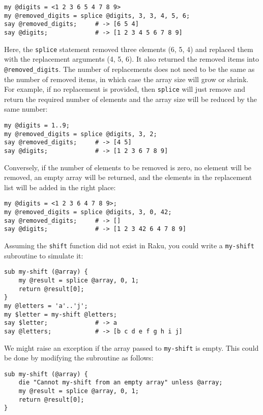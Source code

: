\begin{verbatim}
my @digits = <1 2 3 6 5 4 7 8 9>
my @removed_digits = splice @digits, 3, 3, 4, 5, 6;
say @removed_digits;     # -> [6 5 4]
say @digits;             # -> [1 2 3 4 5 6 7 8 9]
\end{verbatim}
%
Here, the {\tt splice} statement removed three elements (6, 5, 4) 
and replaced them with the replacement arguments (4, 5, 6). 
It also returned the removed items into \verb'@removed_digits'. 
The number of replacements does not need to be the same as the number 
of removed items, in which case the array size will grow or 
shrink. For example, if no replacement is provided, then 
{\tt splice} will just remove and return the required number 
of elements and the array size will be reduced by the same number:

\begin{verbatim}
my @digits = 1..9;
my @removed_digits = splice @digits, 3, 2;
say @removed_digits;     # -> [4 5]
say @digits;             # -> [1 2 3 6 7 8 9]
\end{verbatim}
%

Conversely, if the number of elements to be removed is zero, 
no element will be removed, an empty array will be returned, 
and the elements in the replacement list will be added in 
the right place:

\begin{verbatim}
my @digits = <1 2 3 6 4 7 8 9>;
my @removed_digits = splice @digits, 3, 0, 42;
say @removed_digits;     # -> []
say @digits;             # -> [1 2 3 42 6 4 7 8 9]
\end{verbatim}
%

Assuming the {\tt shift} function did not exist in Raku, 
you could write a {\tt my-shift} subroutine to simulate it:

\begin{verbatim}
sub my-shift (@array) {
    my @result = splice @array, 0, 1;
    return @result[0];
}
my @letters = 'a'..'j';
my $letter = my-shift @letters;
say $letter;             # -> a
say @letters;            # -> [b c d e f g h i j]
\end{verbatim}

We might raise an exception if the array passed to 
{\tt my-shift} is empty. This could be done by modifying 
the subroutine as follows:

\begin{verbatim}
sub my-shift (@array) {
    die "Cannot my-shift from an empty array" unless @array;
    my @result = splice @array, 0, 1;
    return @result[0];
}
\end{verbatim}
%

